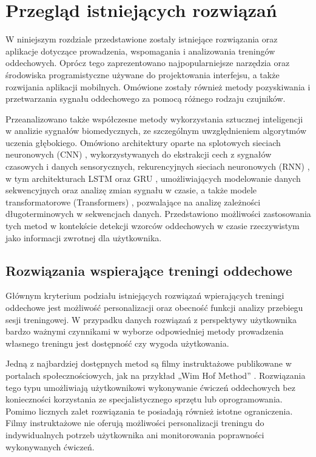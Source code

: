 \chapter{Przegląd istniejących rozwiązań}

W niniejszym rozdziale przedstawione zostały istniejące rozwiązania oraz aplikacje dotyczące prowadzenia, wspomagania i analizowania treningów oddechowych. Oprócz tego zaprezentowano najpopularniejsze narzędzia oraz środowiska programistyczne używane do projektowania interfejsu, a także rozwijania aplikacji mobilnych. Omówione zostały również metody pozyskiwania i przetwarzania sygnału oddechowego za pomocą różnego rodzaju czujników. 

Przeanalizowano także współczesne metody wykorzystania sztucznej inteligencji w analizie sygnałów biomedycznych, ze szczególnym uwzględnieniem algorytmów uczenia głębokiego. Omówiono architektury oparte na splotowych sieciach neuronowych (CNN) \cite{o2015introduction}, wykorzystywanych do ekstrakcji cech z sygnałów czasowych i danych sensorycznych, rekurencyjnych sieciach neuronowych (RNN) \cite{grossberg2013recurrent}, w tym architekturach LSTM \cite{hochreiter1997long} oraz GRU \cite{cho2014learning}, umożliwiających modelowanie danych sekwencyjnych oraz analizę zmian sygnału w czasie, a także modele transformatorowe (Transformers) \cite{vaswani2017attention}, pozwalające na analizę zależności długoterminowych w sekwencjach danych. Przedstawiono możliwości zastosowania tych metod w kontekście detekcji wzorców oddechowych w czasie rzeczywistym jako informacji zwrotnej dla użytkownika.

\section{Rozwiązania wspierające treningi oddechowe}

Głównym kryterium podziału istniejących rozwiązań wpierających treningi oddechowe jest możliwość personalizacji oraz obecność funkcji analizy przebiegu sesji treningowej. W przypadku danych rozwiązań z perspektywy użytkownika bardzo ważnymi czynnikami w wyborze odpowiedniej metody prowadzenia własnego treningu jest dostępność czy wygoda użytkowania. 

Jedną z najbardziej dostępnych metod są filmy instruktażowe publikowane w portalach społecznościowych, jak na przykład „Wim Hof Method” \cite{wimhofbreathing}. Rozwiązania tego typu umożliwiają użytkownikowi wykonywanie ćwiczeń oddechowych bez konieczności korzystania ze specjalistycznego sprzętu lub oprogramowania. Pomimo licznych zalet rozwiązania te posiadają również istotne ograniczenia. Filmy instruktażowe nie oferują możliwości personalizacji treningu do indywidualnych potrzeb użytkownika ani monitorowania poprawności wykonywanych ćwiczeń.

